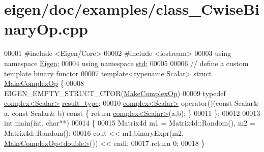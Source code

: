 \hypertarget{eigen_2doc_2examples_2class___cwise_binary_op_8cpp_source}{}\section{eigen/doc/examples/class\+\_\+\+Cwise\+Binary\+Op.cpp}
\label{eigen_2doc_2examples_2class___cwise_binary_op_8cpp_source}

\begin{DoxyCode}
00001 \textcolor{preprocessor}{#include <Eigen/Core>}
00002 \textcolor{preprocessor}{#include <iostream>}
00003 \textcolor{keyword}{using namespace }\hyperlink{namespace_eigen}{Eigen};
00004 \textcolor{keyword}{using namespace }\hyperlink{namespacestd}{std};
00005 
00006 \textcolor{comment}{// define a custom template binary functor}
\hyperlink{struct_make_complex_op}{00007} \textcolor{keyword}{template}<\textcolor{keyword}{typename} Scalar> \textcolor{keyword}{struct }\hyperlink{struct_make_complex_op}{MakeComplexOp} \{
00008   EIGEN\_EMPTY\_STRUCT\_CTOR(\hyperlink{struct_make_complex_op}{MakeComplexOp})
00009   \textcolor{keyword}{typedef} \hyperlink{structcomplex}{complex<Scalar>} \hyperlink{structcomplex}{result\_type};
00010   \hyperlink{structcomplex}{complex<Scalar>} operator()(\textcolor{keyword}{const} Scalar& a, \textcolor{keyword}{const} Scalar& b)\textcolor{keyword}{ const }\{ \textcolor{keywordflow}{return} 
      \hyperlink{structcomplex}{complex<Scalar>}(a,b); \}
00011 \};
00012 
00013 \textcolor{keywordtype}{int} main(\textcolor{keywordtype}{int}, \textcolor{keywordtype}{char}**)
00014 \{
00015   Matrix4d m1 = Matrix4d::Random(), m2 = Matrix4d::Random();
00016   cout << m1.binaryExpr(m2, \hyperlink{struct_make_complex_op}{MakeComplexOp<double>}()) << endl;
00017   \textcolor{keywordflow}{return} 0;
00018 \}
\end{DoxyCode}
